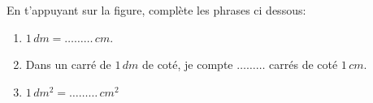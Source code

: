 \begin{pageAD} 




En t'appuyant sur la figure, complète les phrases ci dessous:

\begin{enumerate}
\item $1 \,dm = \dots \ldots \ldots\,cm$.
\item Dans un carré de $1 \,dm$ de coté, je compte $\dots\ldots \ldots$ carrés de coté $1\,cm$.
\item $1 \,dm^2 = \dots \ldots\ldots \,cm^2$
\end{enumerate}




\end{pageAD}
